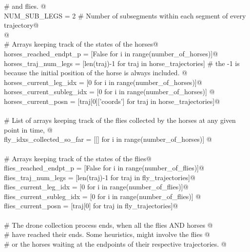 \documentclass[12.0pt]{report}
\begin{document}
\begin{appendices}
\begin{flushleft}
\begin{list}{}{}
\mbox{}\verb@    # and flies. @\\
\mbox{}\verb@    NUM_SUB_LEGS              = 2 # Number of subsegments within each segment of every trajectory@\\
\mbox{}\verb@    @\\
\mbox{}\verb@    # Arrays keeping track of the states of the horses@\\
\mbox{}\verb@    horses_reached_endpt_p    = [False for i in range(number_of_horses)]@\\
\mbox{}\verb@    horses_traj_num_legs      = [len(traj)-1 for traj in horse_trajectories] # the -1 is because the initial position of the horse is always included. @\\
\mbox{}\verb@    horses_current_leg_idx    = [0 for i in range(number_of_horses)]@\\
\mbox{}\verb@    horses_current_subleg_idx = [0 for i in range(number_of_horses)] @\\
\mbox{}\verb@    horses_current_posn       = [traj[0]['coords'] for traj in horse_trajectories]@\\
\mbox{}\verb@@\\
\mbox{}\verb@    # List of arrays keeping track of the flies collected by the horses at any given point in time, @\\
\mbox{}\verb@    fly_idxs_collected_so_far = [[] for i in range(number_of_horses)] @\\
\mbox{}\verb@@\\
\mbox{}\verb@    # Arrays keeping track of the states of the flies@\\
\mbox{}\verb@    flies_reached_endpt_p    = [False for i in range(number_of_flies)]@\\
\mbox{}\verb@    flies_traj_num_legs      = [len(traj)-1 for traj in fly_trajectories]@\\
\mbox{}\verb@    flies_current_leg_idx    = [0 for i in range(number_of_flies)]@\\
\mbox{}\verb@    flies_current_subleg_idx = [0 for i in range(number_of_flies)] @\\
\mbox{}\verb@    flies_current_posn       = [traj[0] for traj in fly_trajectories]@\\
\mbox{}\verb@@\\
\mbox{}\verb@    # The drone collection process ends, when all the flies AND horses @\\
\mbox{}\verb@    # have reached their ends. Some heuristics, might involve the flies @\\
\mbox{}\verb@    # or the horses waiting at the endpoints of their respective trajectories. @\\

\end{list}
\end{flushleft}
\end{appendices}
\end{document}
